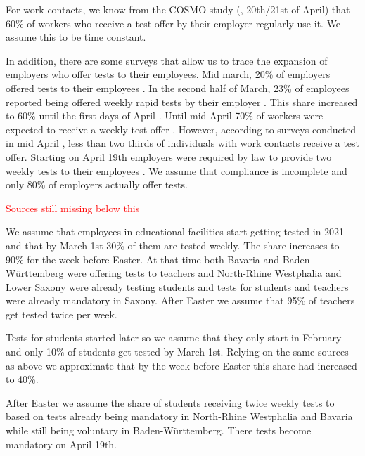 
For work contacts, we know from the COSMO study (\cite{Betsch2021}, 20th/21st of April) that 60\% of workers who receive a test offer by their employer regularly use it. We assume this to be time constant.

In addition, there are some surveys that allow us to trace the expansion of employers who
offer tests to their employees. Mid march, 20\% of employers offered tests to their
employees \citep{DIHK2021}. In the second half of March, 23\% of employees reported being
offered weekly rapid tests by their employer \citep{Ahlers2021}. This share increased to
60\% until the first days of April \cite{ZDF2021}. Until mid April 70\% of workers were
expected to receive a weekly test offer \citep{AerzteZeitung2021}. However, according to
surveys conducted in mid April \citep{Betsch2021}, less than two thirds of individuals
with work contacts receive a test offer. Starting on April 19th employers were required by law to provide two weekly tests to their employees \citep{Bundesanzeiger2021}.
We assume that compliance is incomplete and only 80\% of employers actually offer tests.


\textcolor{red}{Sources still missing below this}

We assume that employees in educational facilities start getting tested in 2021 and that
by March 1st 30\% of them are tested weekly. The share increases to 90\% for the week before Easter. At that time both Bavaria and Baden-Württemberg were offering tests to teachers and North-Rhine Westphalia and Lower Saxony were already testing students and tests for students and teachers were already mandatory in Saxony. After Easter we assume that 95\% of teachers get tested twice per week.

Tests for students started later so we assume that they only start in February and only
10\% of students get tested by March 1st. Relying on the same sources as above we
approximate that by the week before Easter this share had increased to 40\%.

After Easter we assume the share of students receiving twice weekly tests to
based on tests already being mandatory in North-Rhine Westphalia and Bavaria while still
being voluntary in Baden-Württemberg. There tests become mandatory on April 19th.








